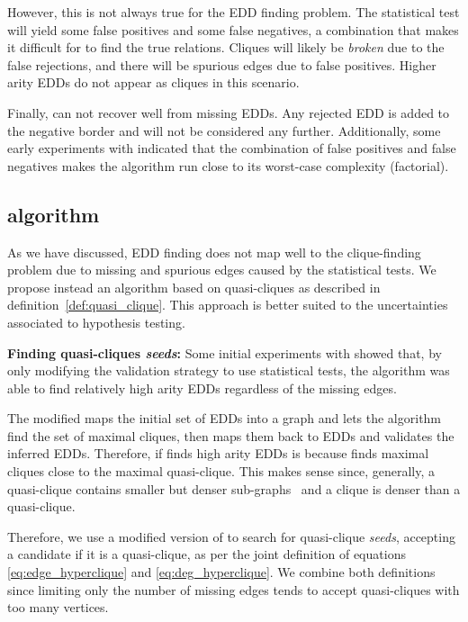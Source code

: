 However, this is not always true for the EDD finding problem. The statistical test
will yield some false positives and some false negatives, a combination that makes it
difficult for \Find to find the true relations. Cliques will likely be \emph{broken} due
to the false rejections, and there will be spurious edges due to false positives.
Higher arity EDDs do not appear as cliques in this scenario.

Finally, \Zigzag can not recover well from missing
EDDs. Any rejected EDD is added to the negative border
and will not be considered any further. Additionally, some
early experiments with \Zigzag indicated
that the combination of false positives and false negatives
makes the algorithm run close to its worst-case complexity (factorial).

\subsection{\PresQ algorithm}
\label{sec:presq}

As we have discussed, EDD finding does not map well to the clique-finding
problem due to missing and spurious edges caused by the statistical tests. We propose instead
an algorithm based on quasi-cliques as described in definition~\ref{def:quasi_clique}.
This approach is better suited to the uncertainties associated to hypothesis testing.

\textbf{Finding quasi-cliques \emph{seeds}:} Some initial experiments with \Find showed that,
by only modifying the validation strategy to use statistical tests, the algorithm was able
to find relatively high arity EDDs regardless of the missing edges.

The modified \Find maps the initial set of EDDs into a graph and lets the \Hyperclique
algorithm find the set of maximal cliques, then maps them back to EDDs and validates the
inferred EDDs. Therefore, if \Find finds high arity EDDs is because \Hyperclique finds
maximal cliques close to the maximal quasi-clique. This makes sense since, generally,
a quasi-clique contains smaller but denser sub-graphs~\cite{SaneiMehri2018} and a clique
is denser than a quasi-clique.

Therefore, we use a modified version of \Hyperclique to search for quasi-clique \emph{seeds},
accepting a candidate if it is a quasi-clique, as per the joint definition of equations
\ref{eq:edge_hyperclique} and \ref{eq:deg_hyperclique}.
We combine both definitions since limiting only the number of missing edges tends to accept
quasi-cliques with too many vertices.

